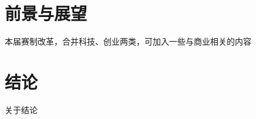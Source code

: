 \documentclass[zihao=-4]{ctexart}
\begin{document}
\begin{spacing}{1.5}
\section{前景与展望}
本届赛制改革，合并科技、创业两类，可加入一些与商业相关的内容

\section{结论}
关于结论

\end{spacing}

\begingroup
{}    %
\setlength{\bibsep}{0pt}    %
\begin{adjustwidth}{0.42cm}{0.42cm} %

\end{adjustwidth}
\endgroup
\end{document}
